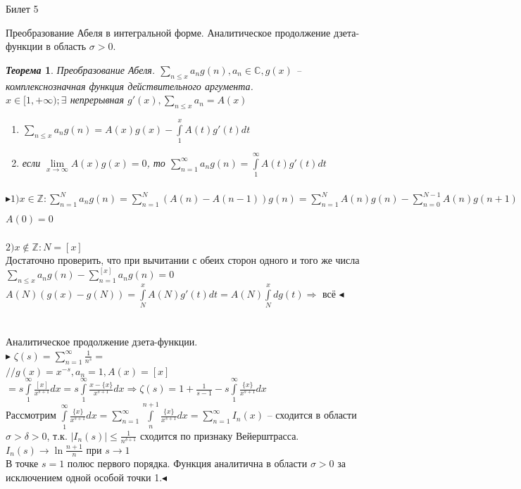\documentclass[a4paper,12pt]{article}
\newtheorem{teo}{\textit{Теорема}}
\newcommand{\q}{\quad}
\newcommand{\pb}{\blacktriangleright}
\newcommand{\pe}{\blacktriangleleft}
\newcommand{\Ra}{\Rightarrow}
\newcommand{\bb}[1]{\mathbb{#1}}
\newcommand{\SL}{\sum\limits}
\newcommand{\IL}{\int\limits}
\begin{document}
\newpage
\begin{mybox}{\hypertarget{bil5}{Билет 5}}

\begin{formbox}{}
Преобразование Абеля в интегральной форме. Аналитическое продолжение дзета-функции в область $\sigma > 0$.
\end{formbox}
\begin{formbox}{}
\begin{teo}
Преобразование Абеля. $\SL_{n\le x} a_n g(n), a_n\in \bb{C}, g(x)$ -- комплекснозначная функция действительного аргумента.\\
$x\in[1,+\infty); \exists$ непрерывная $g'(x), \SL_{n \le x}a_n = A(x)$\\
\begin{enumerate}
    \item $\SL_{n\le x}a_ng(n) = A(x)g(x) - \IL_1^x A(t)g'(t)dt $
    \item если $\lim\limits_{x\to\infty} A(x)g(x) = 0$, то $\SL_{n=1}^\infty a_ng(n) = \IL_1^\infty A(t)g'(t)dt $
\end{enumerate}
\end{teo}
\end{formbox}
$\pb 1) x\in \bb{Z}: \SL_{n=1}^Na_ng(n) = \SL_{n=1}^N(A(n) - A(n-1))g(n) = \SL_{n=1}^N A(n)g(n) - \SL_{n=0}^{N-1} A(n)g(n+1) = A(N)g(N) - \SL_{n=1}^{N-1} (g(n+1) - g(n))A(n) = A(N)g(N) - \IL_1^N A(t)g'(t)dt  $\\$A(0) = 0$\\\q\\
$2) x\not\in \bb{Z} : N = [x]  $\\
Достаточно проверить, что при вычитании с обеих сторон одного и того же числа\\
$\SL_{n\le x}a_ng(n) - \SL_{n=1}^{[x]}a_ng(n)=0 $\\
$A(N) (g(x) - g(N)) = \IL_N^x A(N)g'(t) dt = A(N)\IL_N^x dg(t)\Ra   $ всё $\pe$\\\q\\\q\\
Аналитическое продолжение дзета-функции.\\
$\pb$
$\zeta(s) = \SL_{n=1}^\infty \frac{1}{n^s} =$\\
$//g(x) = x^{-s}, a_n = 1, A(x) = [x]$\\
$ = s\IL_1^\infty \frac{[x]}{x^{s+1}}dx = s\IL_1^\infty \frac{x-\{x\}}{x^{s+1}}dx \Ra \zeta(s) = 1 + \frac{1}{s-1} - s\IL_1^\infty \frac{\{x\}}{x^{s+1}}dx$\\
Рассмотрим $\IL_1^\infty \frac{\{x\}}{x^{s+1}}dx = \SL_{n=1}^\infty \IL_n^{n+1} \frac{\{x\}}{x^{s+1}}dx = \SL_{n=1}^\infty I_n(x) $ -- сходится в области $\sigma > \delta > 0$, т.к. $|I_n(s)| \le \frac{1}{n^{\delta+1}}$ сходится по признаку Вейерштрасса.\\
$I_n(s)\to \ln\frac{n+1}{n} $ при $s\to 1$\\
В точке $s=1$ полюс первого порядка. Функция аналитична в области $\sigma > 0$ за исключением одной особой точки 1.$\pe$
\end{mybox}
\end{document}
